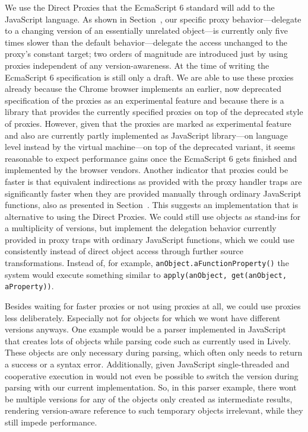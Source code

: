 We use the Direct Proxies that the EcmaScript 6 standard will add to the JavaScript language.
As shown in Section~, our specific proxy behavior---delegate to a changing version of an essentially unrelated object---is currently only five times slower than the default behavior---delegate the access unchanged to the proxy's constant target; two orders of magnitude are introduced just by using proxies independent of any version-awareness.
At the time of writing the EcmaScript 6 specification is still only a draft.
We are able to use these proxies already because the Chrome browser implements an earlier, now deprecated specification of the proxies as an experimental feature and because there is a library that provides the currently specified proxies on top of the deprecated style of proxies.
However, given that the proxies are marked as experimental feature and also are currently partly implemented as JavaScript library---on language level instead by the virtual machine---on top of the deprecated variant, it seems reasonable to expect performance gains once the EcmaScript 6 gets finished and implemented by the browser vendors.
Another indicator that proxies could be faster is that equivalent indirections as provided with the proxy handler traps are significantly faster when they are provided manually through ordinary JavaScript functions, also as presented in Section~.
This suggests an implementation that is alternative to using the Direct Proxies.
We could still use objects as stand-ins for a multiplicity of versions, but implement the delegation behavior currently provided in proxy traps with ordinary JavaScript functions, which we could use consistently instead of direct object access through further source transformations.
Instead of, for example, \lstinline{anObject.aFunctionProperty()} the system would execute something similar to \lstinline{apply(anObject, get(anObject, aProperty))}.

Besides waiting for faster proxies or not using proxies at all, we could use proxies less deliberately.
Especially not for objects for which we wont have different versions anyways.
One example would be a parser implemented in JavaScript that creates lots of objects while parsing code such as currently used in Lively.
These objects are only necessary during parsing, which often only needs to return a success or a syntax error.
Additionally, given JavaScript single-threaded and cooperative execution in would not even be possible to switch the version during parsing with our current implementation.
So, in this parser example, there wont be multiple versions for any of the objects only created as intermediate results, rendering version-aware reference to such temporary objects irrelevant, while they still impede performance.


